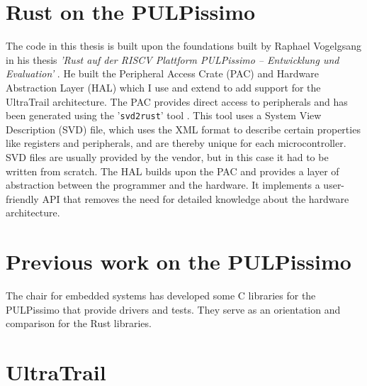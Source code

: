 
\section{Rust on the PULPissimo}

The code in this thesis is built upon the foundations built by Raphael Vogelgsang in his thesis \emph{'Rust auf der RISCV Plattform PULPissimo – Entwicklung und
Evaluation'} \cite{rust_pulp}.
He built the Peripheral Access Crate (PAC) and Hardware Abstraction Layer (HAL) which I use and extend to add support for the UltraTrail architecture.
The PAC provides direct access to peripherals and has been generated using the '\lstinline{svd2rust}' tool \cite{svd2rust}.
This tool uses a System View Description (SVD) file, which uses the XML format to describe certain properties like registers and peripherals, and are
thereby unique for each microcontroller.
SVD files are usually provided by the vendor, but in this case it had to be written from scratch.
The HAL builds upon the PAC and provides a layer of abstraction between the programmer and the hardware.
It implements a user-friendly API that removes the need for detailed knowledge about the hardware architecture.

\section{Previous work on the PULPissimo}

The chair for embedded systems has developed some C libraries for the PULPissimo that provide drivers and tests.
They serve as an orientation and comparison for the Rust libraries.

\section{UltraTrail}

